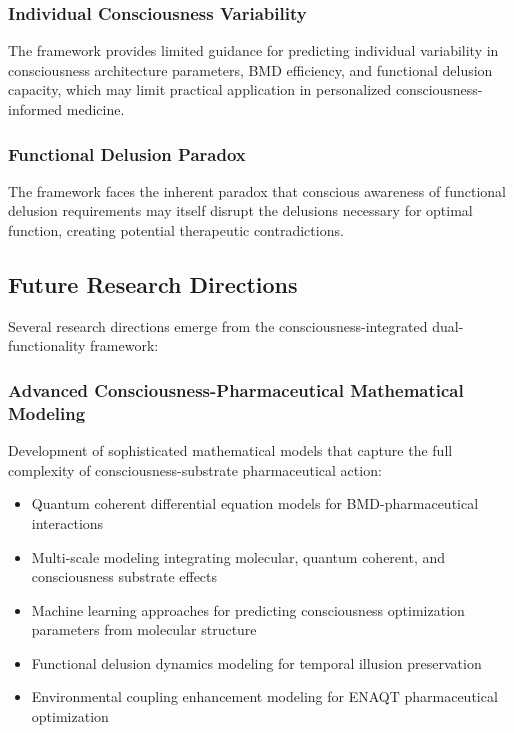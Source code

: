\documentclass[12pt,a4paper]{article}
\begin{document}
\subsubsection{Individual Consciousness Variability}

The framework provides limited guidance for predicting individual variability in consciousness architecture parameters, BMD efficiency, and functional delusion capacity, which may limit practical application in personalized consciousness-informed medicine.

\subsubsection{Functional Delusion Paradox}

The framework faces the inherent paradox that conscious awareness of functional delusion requirements may itself disrupt the delusions necessary for optimal function, creating potential therapeutic contradictions.

\subsection{Future Research Directions}

Several research directions emerge from the consciousness-integrated dual-functionality framework:

\subsubsection{Advanced Consciousness-Pharmaceutical Mathematical Modeling}

Development of sophisticated mathematical models that capture the full complexity of consciousness-substrate pharmaceutical action:

\begin{itemize}
\item Quantum coherent differential equation models for BMD-pharmaceutical interactions
\item Multi-scale modeling integrating molecular, quantum coherent, and consciousness substrate effects
\item Machine learning approaches for predicting consciousness optimization parameters from molecular structure
\item Functional delusion dynamics modeling for temporal illusion preservation
\item Environmental coupling enhancement modeling for ENAQT pharmaceutical optimization
\end{itemize}
\end{document}
